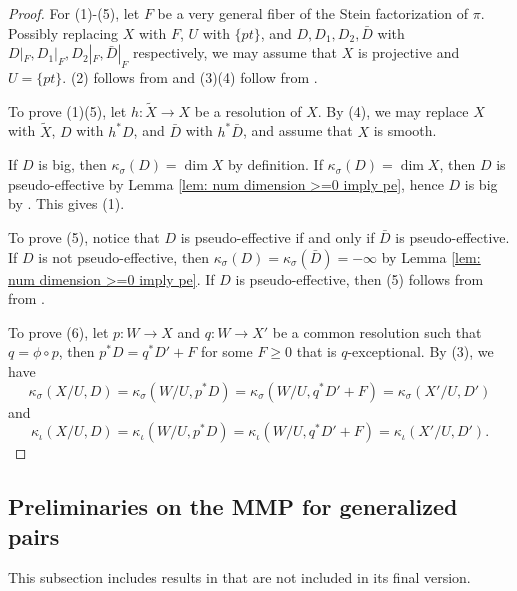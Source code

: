 \documentclass[11pt]{amsart}
\numberwithin{equation}{section}
\theoremstyle{definition}
\theoremstyle{definition}
\theoremstyle{definition}
\begin{document}
\begin{proof}
For (1)-(5), let $F$ be a very general fiber of the Stein factorization of $\pi$. Possibly replacing $X$ with $F$, $U$ with $\{pt\}$, and $D,D_1,D_2,\bar D$ with $D|_F,D_1|_F,D_2|_F,\bar D|_F$ respectively, we may assume that $X$ is projective and $U=\{pt\}$. (2) follows from \cite[Remark 2.8(1)]{HH20} and (3)(4) follow from \cite[Remark 2.8(2)]{HH20}.

To prove (1)(5), let $h: \tilde X\rightarrow X$ be a resolution of $X$. By (4), we may replace $X$ with $\tilde X$, $D$ with $h^*D$, and $\bar D$ with $h^*\bar D$, and assume that $X$ is smooth. 

If $D$ is big, then  $\kappa_{\sigma}(D)=\dim X$ by definition. If $\kappa_{\sigma}(D)=\dim X$, then $D$ is pseudo-effective by Lemma \ref{lem: num dimension >=0 imply pe}, hence $D$ is big by \cite[V. 2.7(3) Proposition]{Nak04}. This gives (1).

To prove (5), notice that $D$ is pseudo-effective if and only if $\bar D$ is pseudo-effective. If $D$ is not pseudo-effective, then $\kappa_{\sigma}(D)=\kappa_{\sigma}(\bar D)=-\infty$ by Lemma \ref{lem: num dimension >=0 imply pe}. If $D$ is pseudo-effective, then (5) follows from from \cite[V. 2.7(1) Proposition]{Nak04}.


To prove (6), let $p: W\rightarrow X$ and $q: W\rightarrow X'$ be a common resolution such that $q=\phi\circ p$, then $p^*D=q^*D'+F$ for some $F\geq 0$ that is $q$-exceptional. By (3), we have
$$\kappa_{\sigma}(X/U,D)=\kappa_{\sigma}(W/U,p^*D)=\kappa_{\sigma}(W/U,q^*D'+F)=\kappa_{\sigma}(X'/U,D')$$
and
$$\kappa_{\iota}(X/U,D)=\kappa_{\iota}(W/U,p^*D)=\kappa_{\iota}(W/U,q^*D'+F)=\kappa_{\iota}(X'/U,D').$$
\end{proof}




\subsection{Preliminaries on the MMP for generalized pairs}

This subsection includes results in \cite[Version 2, Version 3]{HL21} that are not included in its final version.
\end{document}
